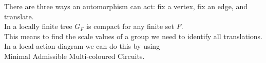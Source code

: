 \documentclass[preview]{standalone}
\begin{document}
There are three ways an automorphism can act: fix a vertex, fix an edge, and translate.\\In a locally finite tree $G_F$ is compact for any finite set $F$.\\This means to find the scale values of a group we need to identify all translations.\phantom{t} \\In a local action diagram we can do this by using \\ {\centering Minimal Admissible Multi-coloured Circuits.}\\
\end{document}
